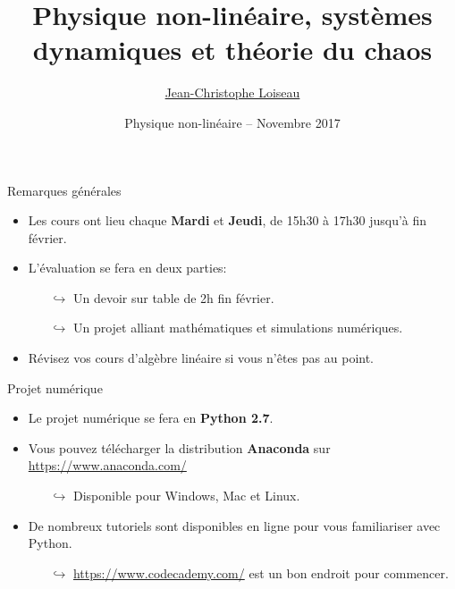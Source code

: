 \documentclass[usenames,dvipsnames,svgnames,10pt,aspectratio=169]{beamer}
\title[Nonlinear physics] %
{
	Physique non-lin\'eaire, syst\`emes \\ dynamiques et th\'eorie du chaos
}
\author[J.-Ch.~Loiseau] %
{
	\underline{Jean-Christophe Loiseau}
}
\institute[unused]
{
	\url{jean-christophe.loiseau@ensam.eu} \\
	Laboratoire DynFluid \\
	Arts et M\'etiers ParisTech, France.
}
\date[unused]{Physique non-lin\'eaire -- Novembre 2017}
\begin{document}
\titleframe %


\begin{frame}[t, c]{Remarques générales}{}
	\begin{itemize}
		\item Les cours ont lieu chaque \textbf{\alert{Mardi}} et \textbf{\alert{Jeudi}}, de 15h30 à 17h30 jusqu'à fin février.

		\bigskip

		\item L'évaluation se fera en deux parties:
		\begin{itemize}
			\item[$\hookrightarrow$] Un devoir sur table de 2h fin février.
			\item[$\hookrightarrow$] Un projet alliant mathématiques et simulations numériques.
		\end{itemize}

		\bigskip

		\item Révisez vos cours d'algèbre linéaire si vous n'êtes pas au point.

	\end{itemize}
\end{frame}

\begin{frame}[t, c]{Projet numérique}{}

	\begin{itemize}
		\item Le projet numérique se fera en \alert{\textbf{Python 2.7}}.

		\bigskip

		\item Vous pouvez télécharger la distribution \alert{\textbf{Anaconda}} sur \url{https://www.anaconda.com/}
		\begin{itemize}
			\item[$\hookrightarrow$] Disponible pour Windows, Mac et Linux.
		\end{itemize}

		\bigskip

		\item De nombreux tutoriels sont disponibles en ligne pour vous familiariser avec Python.
		\begin{itemize}
			\item[$\hookrightarrow$] \url{https://www.codecademy.com/} est un bon endroit pour commencer.
		\end{itemize}

	\end{itemize}

	\vspace{1cm}
\end{frame}
\end{document}
